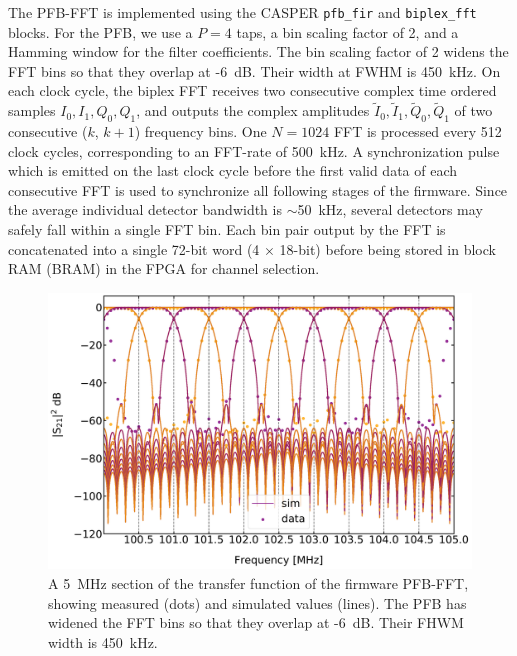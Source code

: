 The PFB-FFT is implemented using the CASPER \texttt{pfb\_fir} and \texttt{biplex\_fft} blocks. For the PFB, we use a $P = 4$ taps, a bin scaling factor of 2, and a Hamming window for the filter coefficients. The bin scaling factor of 2 widens the FFT bins so that they overlap at -6~dB. Their width at FWHM is 450~kHz. On each clock cycle, the biplex FFT receives two consecutive complex time ordered samples $I_{0}, I_{1}, Q_{0}, Q_{1}$, and outputs the complex amplitudes $\widetilde{I}_{0}, \widetilde{I}_{1}, \widetilde{Q}_{0}, \widetilde{Q}_{1}$ of two consecutive ($k$, $k + 1$) frequency bins. One $N = 1024$ FFT is processed every 512 clock cycles, corresponding to an FFT-rate of 500~kHz. A synchronization pulse which is emitted on the last clock cycle before the first valid data of each consecutive FFT is used to synchronize all following stages of the firmware. Since the average individual detector bandwidth is $\sim$50~kHz, several detectors may safely fall within a single FFT bin. Each bin pair output by the FFT is concatenated into a single 72-bit word (4 $\times$ 18-bit) before being stored in block RAM (BRAM) in the FPGA for channel selection.

\begin{figure}[!htbp]
\centering
\includegraphics[width=\textwidth]{figures/readout/sim/pfb_fft_comp}
\caption[~A 5~MHz section of the transfer function of the firmware PFB-FFT, showing measured (dots) and simulated values (lines).]{A 5~MHz section of the transfer function of the firmware PFB-FFT, showing measured (dots) and simulated values (lines). The PFB has widened the FFT bins so that they overlap at -6~dB. Their FHWM width is 450~kHz.}
\label{fig:pfb fft zoom}
\end{figure}

